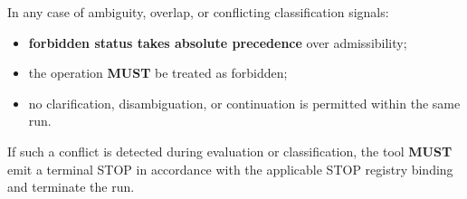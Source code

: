 In any case of ambiguity, overlap, or conflicting classification signals:
\begin{itemize}
  \item \textbf{forbidden status takes absolute precedence} over admissibility;
  \item the operation \textbf{MUST} be treated as forbidden;
  \item no clarification, disambiguation, or continuation is permitted within the same run.
\end{itemize}

If such a conflict is detected during evaluation or classification,
the tool \textbf{MUST} emit a terminal STOP in accordance with the applicable STOP registry binding
and terminate the run.
